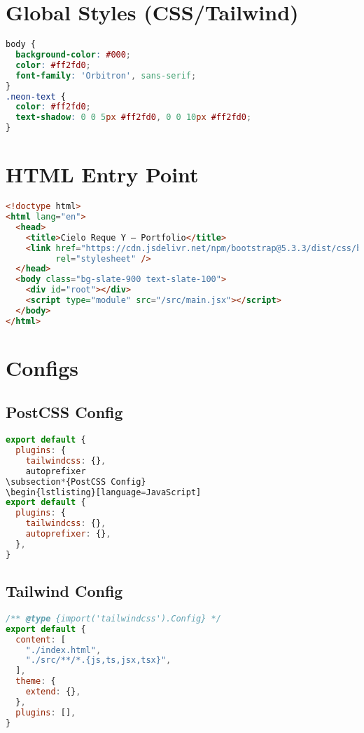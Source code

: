 \documentclass[11pt]{article}
\begin{document}
\section*{Global Styles (CSS/Tailwind)}
\begin{lstlisting}[language=CSS]
body {
  background-color: #000;
  color: #ff2fd0;
  font-family: 'Orbitron', sans-serif;
}
.neon-text {
  color: #ff2fd0;
  text-shadow: 0 0 5px #ff2fd0, 0 0 10px #ff2fd0;
}
\end{lstlisting}

\section*{HTML Entry Point}
\begin{lstlisting}[language=HTML]
<!doctype html>
<html lang="en">
  <head>
    <title>Cielo Reque Y — Portfolio</title>
    <link href="https://cdn.jsdelivr.net/npm/bootstrap@5.3.3/dist/css/bootstrap.min.css"
          rel="stylesheet" />
  </head>
  <body class="bg-slate-900 text-slate-100">
    <div id="root"></div>
    <script type="module" src="/src/main.jsx"></script>
  </body>
</html>
\end{lstlisting}

\section*{Configs}
\subsection*{PostCSS Config}
\begin{lstlisting}[language=JavaScript]
export default {
  plugins: {
    tailwindcss: {},
    autoprefixer
\subsection*{PostCSS Config}
\begin{lstlisting}[language=JavaScript]
export default {
  plugins: {
    tailwindcss: {},
    autoprefixer: {},
  },
}
\end{lstlisting}

\subsection*{Tailwind Config}
\begin{lstlisting}[language=JavaScript]
/** @type {import('tailwindcss').Config} */
export default {
  content: [
    "./index.html",
    "./src/**/*.{js,ts,jsx,tsx}",
  ],
  theme: {
    extend: {},
  },
  plugins: [],
}
\end{lstlisting}
\end{document}

